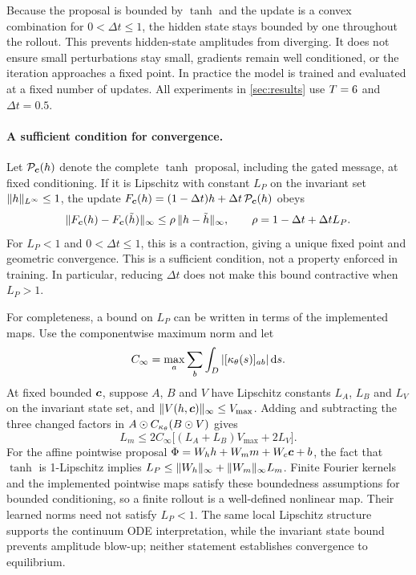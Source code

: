 Because the proposal is bounded by $\tanh$ and the update is a convex combination for $0<\Delta t\le1$, the hidden state stays bounded by one throughout the rollout. This prevents hidden-state amplitudes from diverging. It does not ensure small perturbations stay small, gradients remain well conditioned, or the iteration approaches a fixed point. In practice the model is trained and evaluated at a fixed number of updates. All experiments in \cref{sec:results} use $T=6$ and $\Delta t=0.5$.

\paragraph{A sufficient condition for convergence.} Let $\mathcal P_{\bm{c}}(h)$ denote the complete $\tanh$ proposal, including the gated message, at fixed conditioning. If it is Lipschitz with constant $L_P$ on the invariant set $\lVert h\rVert_{L^\infty}\le1$, the update $F_{\bm{c}}(h)=(1-\Delta t)h+\Delta t\,\mathcal P_{\bm{c}}(h)$ obeys
\begin{equation}
  \label{eq:rhizome-contraction}
  \lVert F_{\bm{c}}(h)-F_{\bm{c}}(\tilde h)\rVert_\infty
  \le \rho\,\lVert h-\tilde h\rVert_\infty,
  \qquad \rho=1-\Delta t+\Delta t L_P.
\end{equation}
For $L_P<1$ and $0<\Delta t\le1$, this is a contraction, giving a unique fixed point and geometric convergence. This is a sufficient condition, not a property enforced in training. In particular, reducing $\Delta t$ does not make this bound contractive when $L_P>1$.

For completeness, a bound on $L_P$ can be written in terms of the implemented maps. Use the componentwise maximum norm and let
\begin{equation}
 C_\infty=\max_a\sum_b\int_D|[\kappa_\theta(s)]_{ab}|\,\mathrm{d} s.
\end{equation}
At fixed bounded $\bm{c}$, suppose $A$, $B$ and $V$ have Lipschitz constants $L_A$, $L_B$ and $L_V$ on the invariant state set, and $\lVert V(h,\bm{c})\rVert_\infty\le V_{\max}$. Adding and subtracting the three changed factors in $A\odot C_{\kappa_\theta}(B\odot V)$ gives
\begin{equation}
  \label{eq:rhizome-message-lipschitz}
  L_m\le 2C_\infty\big[(L_A+L_B)V_{\max}+2L_V\big].
\end{equation}
For the affine pointwise proposal $\Phi=W_hh+W_m m+W_c\bm{c}+b$, the fact that $\tanh$ is 1-Lipschitz implies $L_P\le\lVert W_h\rVert_\infty+\lVert W_m\rVert_\infty L_m$. Finite Fourier kernels and the implemented pointwise maps satisfy these boundedness assumptions for bounded conditioning, so a finite rollout is a well-defined nonlinear map. Their learned norms need not satisfy $L_P<1$. The same local Lipschitz structure supports the continuum ODE interpretation, while the invariant state bound prevents amplitude blow-up; neither statement establishes convergence to equilibrium.

